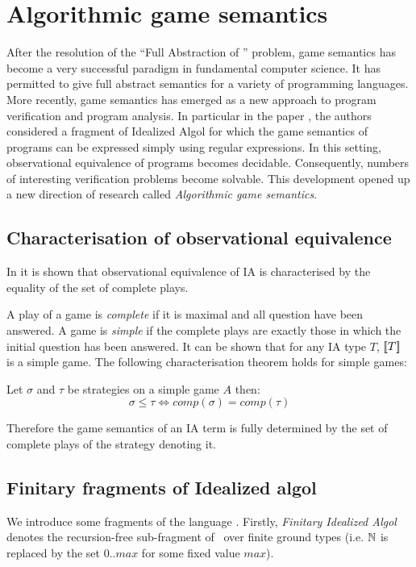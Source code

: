 \section{Algorithmic game semantics}

After the resolution of the ``Full Abstraction of \pcf'' problem,
game semantics has become a very successful paradigm in fundamental
computer science. It has permitted to give full abstract semantics
for a variety of programming languages. More recently, game
semantics has emerged as a new approach to program verification and
program analysis. In particular in the paper \cite{ghicamccusker00},
the authors considered a fragment of Idealized Algol for which the
game semantics of programs can be expressed simply using regular
expressions. In this setting, observational equivalence of programs
becomes decidable. Consequently, numbers of interesting verification
problems become solvable. This development opened up a new direction
of research called \emph{Algorithmic game semantics}.

\subsection{Characterisation of observational equivalence}

In \citep{AM97a} it is shown that observational equivalence of IA is
characterised by the equality of the set of complete plays.

A play of a game is \emph{complete} if it is maximal and all
question have been answered. A game is \emph{simple} if the complete
plays are exactly those in which the initial question has been
answered. It can be shown that for any IA type $T$, ${[\![ T ]\!]}$ is a
simple game. The following characterisation theorem holds for simple
games:
\begin{thm}
Let $\sigma$ and $\tau$ be strategies on a simple game $A$ then:
$$\sigma \leq \tau \iff \textit{comp}(\sigma) = \textit{comp}(\tau)$$
\end{thm}
Therefore the game semantics of an IA term is fully determined by
the set of complete plays of the strategy denoting it.

\subsection{Finitary fragments of Idealized algol}
We introduce
some fragments of the language \ialgol. Firstly, \emph{Finitary
Idealized Algol} denotes the recursion-free sub-fragment of \ialgol\
over finite ground types (i.e. $\mathbb{N}$ is replaced by the set $0..max$ for some
fixed value $max$).

